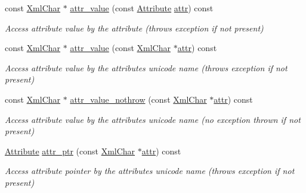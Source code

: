 \begin{DoxyCompactItemize}
const \hyperlink{namespace_d_d4hep_1_1_x_m_l_a09e5d9cc86ed782f6826dfe0778c1815}{Xml\+Char} $\ast$ \hyperlink{class_d_d4hep_1_1_x_m_l_1_1_handle__t_ae6100371b221d2e5bd7528384d37ec73}{attr\+\_\+value} (const \hyperlink{namespace_d_d4hep_1_1_x_m_l_a5c19b7116be99d69b4b22d911357baaf}{Attribute} \hyperlink{class_d_d4hep_1_1_x_m_l_1_1_handle__t_a5b116e138ee498803385f9ec503395c3}{attr}) const
\begin{DoxyCompactList}\small\item\em Access attribute value by the attribute (throws exception if not present) \end{DoxyCompactList}\item 
const \hyperlink{namespace_d_d4hep_1_1_x_m_l_a09e5d9cc86ed782f6826dfe0778c1815}{Xml\+Char} $\ast$ \hyperlink{class_d_d4hep_1_1_x_m_l_1_1_handle__t_a48291a1224fba91941a4d1ce7e092181}{attr\+\_\+value} (const \hyperlink{namespace_d_d4hep_1_1_x_m_l_a09e5d9cc86ed782f6826dfe0778c1815}{Xml\+Char} $\ast$\hyperlink{class_d_d4hep_1_1_x_m_l_1_1_handle__t_a5b116e138ee498803385f9ec503395c3}{attr}) const
\begin{DoxyCompactList}\small\item\em Access attribute value by the attribute\textquotesingle{}s unicode name (throws exception if not present) \end{DoxyCompactList}\item 
const \hyperlink{namespace_d_d4hep_1_1_x_m_l_a09e5d9cc86ed782f6826dfe0778c1815}{Xml\+Char} $\ast$ \hyperlink{class_d_d4hep_1_1_x_m_l_1_1_handle__t_a690047ce386db6a1a783dcb419ec39c1}{attr\+\_\+value\+\_\+nothrow} (const \hyperlink{namespace_d_d4hep_1_1_x_m_l_a09e5d9cc86ed782f6826dfe0778c1815}{Xml\+Char} $\ast$\hyperlink{class_d_d4hep_1_1_x_m_l_1_1_handle__t_a5b116e138ee498803385f9ec503395c3}{attr}) const
\begin{DoxyCompactList}\small\item\em Access attribute value by the attribute\textquotesingle{}s unicode name (no exception thrown if not present) \end{DoxyCompactList}\item 
\hyperlink{namespace_d_d4hep_1_1_x_m_l_a5c19b7116be99d69b4b22d911357baaf}{Attribute} \hyperlink{class_d_d4hep_1_1_x_m_l_1_1_handle__t_a24ef9bea47f64d01510b34bbada99b47}{attr\+\_\+ptr} (const \hyperlink{namespace_d_d4hep_1_1_x_m_l_a09e5d9cc86ed782f6826dfe0778c1815}{Xml\+Char} $\ast$\hyperlink{class_d_d4hep_1_1_x_m_l_1_1_handle__t_a5b116e138ee498803385f9ec503395c3}{attr}) const
\begin{DoxyCompactList}\small\item\em Access attribute pointer by the attribute\textquotesingle{}s unicode name (throws exception if not present) \end{DoxyCompactList}\item 

\end{DoxyCompactItemize}

